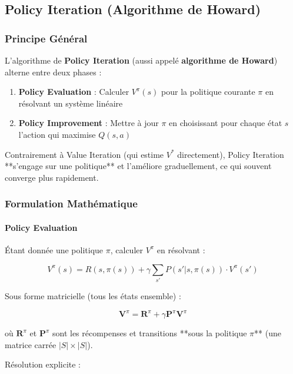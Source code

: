 \documentclass[11pt,a4paper]{article}
\newcommand{\mat}[1]{\mathbf{#1}}
\begin{document}
\subsection{Policy Iteration (Algorithme de Howard)}
 
\subsubsection{Principe Général}
 
L'algorithme de \textbf{Policy Iteration} (aussi appelé \textbf{algorithme de Howard})
alterne entre deux phases :
 
\begin{enumerate}[leftmargin=1.5cm,itemsep=3pt]
  \item \textbf{Policy Evaluation} : Calculer $V^\pi(s)$ pour la politique courante $\pi$
        en résolvant un système linéaire
  \item \textbf{Policy Improvement} : Mettre à jour $\pi$ en choisissant
        pour chaque état $s$ l'action qui maximise $Q(s,a)$
\end{enumerate}
 
Contrairement à Value Iteration (qui estime $V^*$ directement), Policy Iteration
**s'engage sur une politique** et l'améliore graduellement, ce qui souvent
converge plus rapidement.
 
\subsubsection{Formulation Mathématique}
 
\paragraph{Policy Evaluation}
 
Étant donnée une politique $\pi$, calculer $V^\pi$ en résolvant :
 
\[
  V^\pi(s) = R(s,\pi(s)) + \gamma \sum_{s'} P(s'|s,\pi(s)) \cdot V^\pi(s')
\]
 
Sous forme matricielle (tous les états ensemble) :
 
\[
  \mat{V}^\pi = \mat{R}^\pi + \gamma \mat{P}^\pi \mat{V}^\pi
\]
 
où $\mat{R}^\pi$ et $\mat{P}^\pi$ sont les récompenses et transitions
**sous la politique $\pi$** (une matrice carrée $|S| \times |S|$).
 
Résolution explicite :
 
\end{document}
